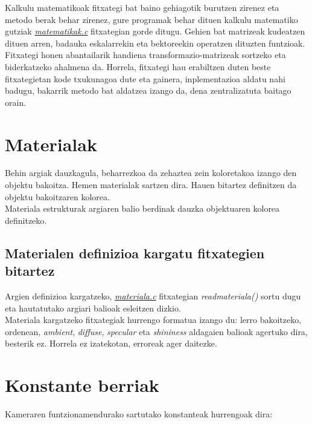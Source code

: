 \documentclass[12pt]{article}
\newcommand{\fitxategi}[1] {\underline{\textit{#1}}}
\newcommand{\metodo}[1] {\textit{#1}}
\newcommand{\aldagai}[1] {\textit{#1}}
\begin{document}
Kalkulu matematikoak fitxategi bat baino gehiagotik burutzen zirenez eta metodo berak behar zirenez, gure programak behar dituen kalkulu matematiko gutziak \fitxategi{matematikak.c} fitxategian gorde ditugu. Gehien bat matrizeak kudeatzen dituen arren, badauka eskalarrekin eta bektoreekin operatzen dituzten funtzioak.\\

Fitxategi honen abantailarik handiena transformazio-matrizeak sortzeko eta biderkatzeko ahalmena da. Horrela, fitxategi hau erabiltzen duten beste fitxategietan kode txukunagoa dute eta gainera, inplementazioa aldatu nahi badugu, bakarrik metodo bat aldatzea izango da, dena zentralizatuta baitago orain.

\section{Materialak}

Behin argiak dauzkagula, beharrezkoa da zehaztea zein koloretakoa izango den objektu bakoitza. Hemen materialak sartzen dira. Hauen bitartez definitzen da objektu bakoitzaren kolorea.\\

Materiala estrukturak argiaren balio berdinak dauzka objektuaren kolorea definitzeko.

\subsection{Materialen definizioa kargatu fitxategien bitartez}

Argien definizioa kargatzeko, \fitxategi{materiala.c} fitxategian \metodo{readmateriala()} sortu dugu eta hautatutako argiari balioak esleitzen dizkio.\\

Materiala kargatzeko fitxategiak hurrengo formatua izango du: lerro bakoitzeko, ordenean, \aldagai{ambient}, \aldagai{diffuse}, \aldagai{specular} eta \aldagai{shininess} aldagaien balioak agertuko dira, besterik ez. Horrela ez izatekotan, erroreak ager daitezke.

\section{Konstante berriak}\label{constants}

Kameraren funtzionamendurako sartutako konstanteak hurrengoak dira:
\end{document}
